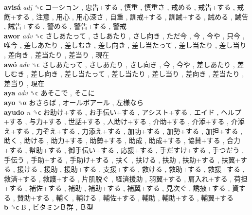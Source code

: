 \textbf{avisá} \emph{adj}  ␝ϲ   コーション ,  忠告+する ,  慎重 ,  慎重さ ,  戒める ,  戒告+する ,  戒飭+する ,  注意 ,  用心 ,  用心深さ ,  自重 ,  訓戒+する ,  訓誡+する ,  誡める ,  誡告 ,  誡告+する ,  警める ,  警告+する ,  警戒   \\
\textbf{awor} \emph{adv}  ␝ϲ   さしあたって ,  さしあたり ,  さし向き ,  ただ今 ,  今 ,  今や ,  只今 ,  唯今 ,  差しあたり ,  差しむき ,  差し向き ,  差し当たって ,  差し当たり ,  差し当り ,  差向き ,  差当たり ,  差当り ,  現在   \\
\textbf{awó} \emph{adv}  ␝ϲ   さしあたって ,  さしあたり ,  さし向き ,  今 ,  今や ,  差しあたり ,  差しむき ,  差し向き ,  差し当たって ,  差し当たり ,  差し当り ,  差向き ,  差当たり ,  差当り ,  現在   \\
\textbf{aya} \emph{adv}  ␝ϲ   あそこで ,  そこに   \\
\textbf{ayo} ␝α   おさらば ,  オールボアール ,  左様なら   \\
\textbf{ayudo} \emph{n}  ␝ϲ   お助け+する ,  お手伝い+する ,  アシスト+する ,  エイド ,  ヘルプ+する ,  与力+する ,  世話+する ,  人助け+する ,  介助+する ,  介添+する ,  介添え+する ,  力ぞえ+する ,  力添え+する ,  加功+する ,  加勢+する ,  加担+する ,  助く ,  助ける ,  助力+する ,  助勢+する ,  助成 ,  助成+する ,  協賛+する ,  合力+する ,  幇助+する ,  御手伝い+する ,  応援+する ,  手だすけ+する ,  手つだう ,  手伝う ,  手助+する ,  手助け+する ,  扶く ,  扶ける ,  扶助 ,  扶助+する ,  扶翼+する ,  援ける ,  援助 ,  援助+する ,  支援+する ,  救ける ,  救助+する ,  救援+する ,  救済+する ,  救護+する ,  片肌脱ぐ ,  経済援助 ,  羽翼+する ,  肩入れ+する ,  荷担+する ,  補佐+する ,  補助 ,  補助+する ,  補翼+する ,  見次ぐ ,  誘掖+する ,  資する ,  賛助+する ,  輔く ,  輔ける ,  輔佐+する ,  輔助 ,  輔助+する ,  輔翼+する   \\
\textbf{b} ␝ϲ   B ,  ビタミンＢ群 ,  Ｂ型   \\
